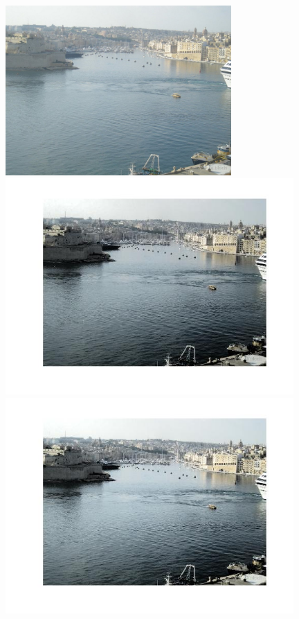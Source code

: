 \documentclass{article}
\begin{document}
\begin{figure}[!hbt]
\centering
\begin{minipage}{0.33\textwidth}
\centering
\includegraphics[width=0.77\textwidth]{../pictures/malta.jpg}
\end{minipage}%
\begin{minipage}{0.33\textwidth}
\centering
\includegraphics[width=0.98\textwidth]{images/im_xx.jpg}
\end{minipage}%
\begin{minipage}{0.33\textwidth}
\centering
\includegraphics[width=0.98\textwidth]{images/p3_malta_xx.jpg}

\end{minipage}
\end{figure}
\end{document}
